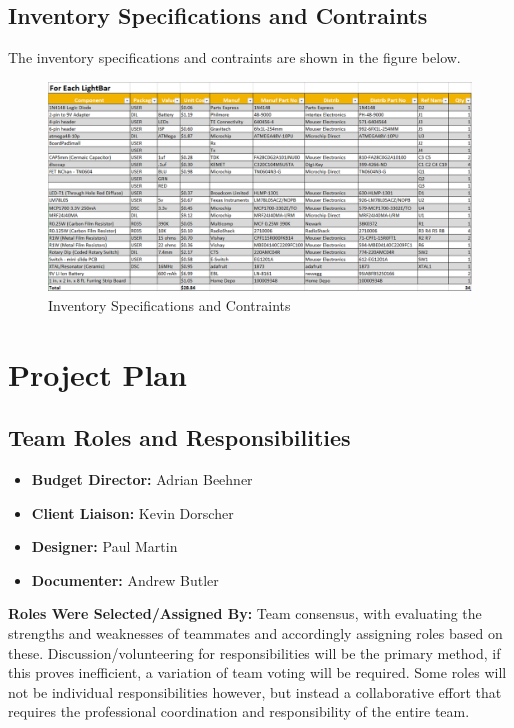 \documentclass[12pt]{article}
\begin{document}
			\subsection{Inventory Specifications and Contraints}
			The inventory specifications and contraints are shown in the figure below.
				\begin{figure}[ht!]
					\centering
					\includegraphics[width=160mm]{assets/Budget_Parts.png}
					\caption{Inventory Specifications and Contraints}
				\end{figure}
			
			\clearpage
			
		\section{Project Plan}
			
			\subsection{Team Roles and Responsibilities}
				\begin{itemize}
					\item \textbf{Budget Director:} Adrian Beehner
					\item \textbf{Client Liaison:} Kevin Dorscher
					\item \textbf{Designer:} Paul Martin
					\item \textbf{Documenter:} Andrew Butler\\
				\end{itemize}
			
				\noindent \textbf{Roles Were Selected/Assigned By:} Team consensus, with evaluating the strengths and weaknesses of teammates and accordingly assigning roles based on these. Discussion/volunteering for responsibilities will be the primary method, if this proves inefficient, a variation of team voting will be required.  Some roles will not be individual responsibilities however, but instead a collaborative effort that requires the professional coordination and responsibility of the entire team.
				
\end{document}
